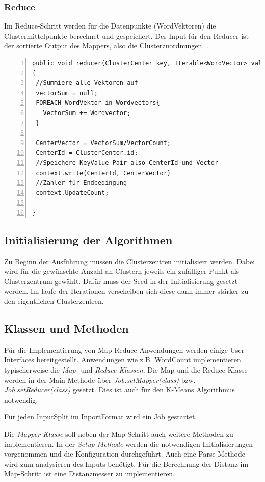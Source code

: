 \subsubsection{Reduce}

Im Reduce-Schritt werden für die Datenpunkte (WordVektoren) die Clustermittelpunkte berechnet und gespeichert. Der Input für den Reducer ist der sortierte Output des Mappers, also die Clusterzuordnungen. .
\begin{lstlisting}[caption=Reduce Pseudocode,label=lst:reduce,numbers=left,xleftmargin=2em,framexleftmargin=2em]
public void reducer(ClusterCenter key, Iterable<WordVector> values, Context context)
{
 //Summiere alle Vektoren auf
 vectorSum = null;
 FOREACH WordVektor in Wordvectors{
   VectorSum += Wordvector; 
 }
 
 CenterVector = VectorSum/VectorCount;
 CenterId = ClusterCenter.id;
 //Speichere KeyValue Pair also CenterId und Vector
 context.write(CenterId, CenterVector)
 //Zähler für Endbedingung
 context.UpdateCount;
 
}
\end{lstlisting}

\subsection{Initialisierung der Algorithmen}
Zu Beginn der Ausführung müssen die Clusterzentren initialisiert werden. Dabei wird für die gewünschte Anzahl an Clustern jeweils ein zufälliger Punkt als Clusterzentrum gewählt. Dafür muss der Seed in der Initialisierung gesetzt werden. Im laufe der Iterationen verscheiben sich diese dann immer stärker zu den eigentlichen Clusterzentren.

\subsection{Klassen und Methoden}
Für die Implementierung von Map-Reduce-Anwendungen werden einige User-Interfaces bereitgestellt. Anwendungen wie z.B. WordCount implementieren typischerweise die \textit{Map-} und \textit{Reduce-Klassen}. Die Map und die Reduce-Klasse werden in der Main-Methode über \textit{Job.setMapper(class)} bzw. \textit{Job.setReducer(class)}  gesetzt. Dies ist auch für den K-Means Algorithmus notwendig.

Für jeden InputSplit im InportFormat wird ein Job gestartet.

Die \textit{Mapper Klasse} soll neben der Map Schritt auch weitere Methoden zu implementieren. In der \textit{Setup-Methode} werden die notwendigen Initialisierungen vorgenommen und die Konfiguration durchgeführt. Auch eine Parse-Methode wird zum analysieren des Inputs benötigt. Für die Berechnung der Distanz im Map-Schritt ist eine Distanzmesser zu implementieren.

